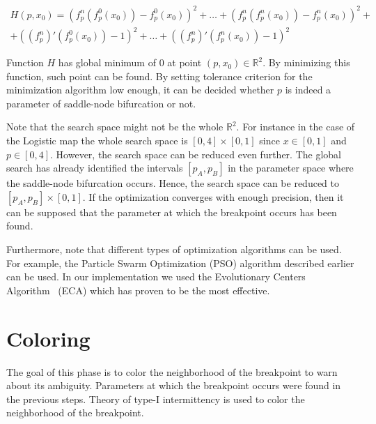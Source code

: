 \begin{multline*} 
H(p, x_0) = (f_{p}^{n}(f_{p}^{0}(x_0)) - f_{p}^{0}(x_0))^2 + \dots + (f_{p}^{n}(f_{p}^{n}(x_0)) - f_{p}^{n}(x_0))^2 + \\
    + ((f_{p}^{n})'(f_{p}^{0}(x_0)) -1)^2 + \dots + ((f_{p}^{n})'(f_{p}^{n}(x_0)) -1)^2
\end{multline*}

Function $H$ has global minimum of $0$ at point $(p, x_0) \in \mathbb{R}^{2}$.
By minimizing this function, such point can be found.
By setting tolerance criterion for the minimization algorithm low enough, it can be decided whether $p$ is indeed a parameter of saddle-node bifurcation or not.
\par
Note that the search space might not be the whole $\mathbb{R}^{2}$.
For instance in the case of the Logistic map the whole search space is $[0, 4] \times [0, 1]$ since $x \in [0,1]$ and $p \in [0,4]$.
However, the search space can be reduced even further.
The global search has already identified the intervals $[p_A, p_B]$ in the parameter space where the saddle-node bifurcation occurs.
Hence, the search space can be reduced to $[p_A, p_B] \times [0, 1]$.
If the optimization converges with enough precision, then it can be supposed that the parameter at which the breakpoint occurs has been found.
\par
Furthermore, note that different types of optimization algorithms can be used.
For example, the Particle Swarm Optimization (PSO) algorithm described earlier can be used.
In our implementation we used the Evolutionary Centers Algorithm~\cite{MejiadeDios20190913} (ECA)  which has proven to be the most effective.

\section{Coloring}
The goal of this phase is to color the neighborhood of the breakpoint to warn about its ambiguity.
Parameters at which the breakpoint occurs were found in the previous steps.
Theory of type-I intermittency is used to color the neighborhood of the breakpoint.

